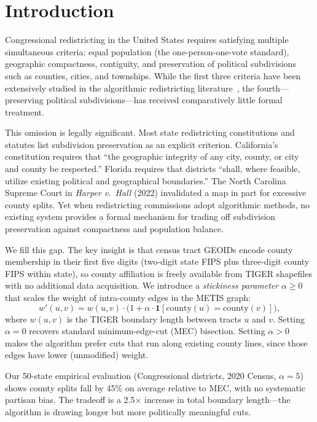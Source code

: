 \section{Introduction}
\label{sec:intro}

Congressional redistricting in the United States requires satisfying multiple
simultaneous criteria: equal population (the one-person-one-vote standard),
geographic compactness, contiguity, and preservation of political subdivisions
such as counties, cities, and townships.
While the first three criteria have been extensively studied in the algorithmic
redistricting literature~\citep{Duchin2019, Mehrotra1998}, the fourth---preserving
political subdivisions---has received comparatively little formal treatment.

This omission is legally significant.
Most state redistricting constitutions and statutes list subdivision preservation
as an explicit criterion.
California's constitution requires that ``the geographic integrity of any city,
county, or city and county be respected.''
Florida requires that districts ``shall, where feasible, utilize existing
political and geographical boundaries.''
The North Carolina Supreme Court in \emph{Harper v.\ Hall} (2022) invalidated
a map in part for excessive county splits.
Yet when redistricting commissions adopt algorithmic methods, no existing system
provides a formal mechanism for trading off subdivision preservation against
compactness and population balance.

We fill this gap.
The key insight is that census tract GEOIDs encode county membership in their
first five digits (two-digit state FIPS plus three-digit county FIPS within state),
so county affiliation is freely available from TIGER shapefiles with no additional
data acquisition.
We introduce a \emph{stickiness parameter} $\alpha \geq 0$ that scales the weight
of intra-county edges in the METIS graph:
\begin{equation}
  w'(u,v) = w(u,v) \cdot \bigl(1 + \alpha \cdot \mathbf{1}[\text{county}(u) = \text{county}(v)]\bigr),
  \label{eq:weight}
\end{equation}
where $w(u,v)$ is the TIGER boundary length between tracts $u$ and $v$.
Setting $\alpha = 0$ recovers standard minimum-edge-cut (MEC) bisection.
Setting $\alpha > 0$ makes the algorithm prefer cuts that run along existing
county lines, since those edges have lower (unmodified) weight.

Our 50-state empirical evaluation (Congressional districts, 2020 Census, $\alpha = 5$)
shows county splits fall by 45\% on average relative to MEC, with no systematic
partisan bias.
The tradeoff is a 2.5$\times$ increase in total boundary length---the algorithm
is drawing longer but more politically meaningful cuts.

